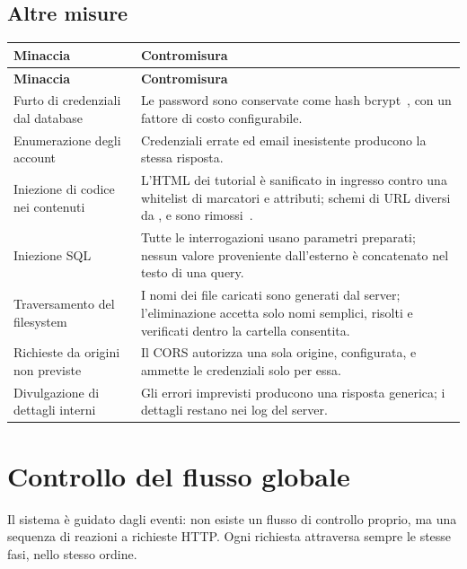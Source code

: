 \subsection{Altre misure}

\begin{longtable}{@{}L{4.2cm} L{10.2cm}@{}}
\toprule
\textbf{Minaccia} & \textbf{Contromisura} \\
\midrule
\endfirsthead
\toprule
\textbf{Minaccia} & \textbf{Contromisura} \\
\midrule
\endhead
\bottomrule
\endlastfoot

Furto di credenziali dal database &
Le password sono conservate come hash bcrypt~\cite{provos1999}, con un fattore
di costo configurabile. \\

Enumerazione degli account &
Credenziali errate ed email inesistente producono la stessa risposta. \\

Iniezione di codice nei contenuti &
L'HTML dei tutorial è sanificato in ingresso contro una whitelist di
marcatori e attributi; schemi di URL diversi da ,  e
 sono rimossi~\cite{owasp2021}. \\

Iniezione SQL &
Tutte le interrogazioni usano parametri preparati; nessun valore proveniente
dall'esterno è concatenato nel testo di una query. \\

Traversamento del filesystem &
I nomi dei file caricati sono generati dal server; l'eliminazione accetta solo
nomi semplici, risolti e verificati dentro la cartella consentita. \\

Richieste da origini non previste &
Il CORS autorizza una sola origine, configurata, e ammette le credenziali solo
per essa. \\

Divulgazione di dettagli interni &
Gli errori imprevisti producono una risposta generica; i dettagli restano nei
log del server. \\

\end{longtable}

\section{Controllo del flusso globale}
\label{sec:sdd-flusso}

Il sistema è guidato dagli eventi: non esiste un flusso di controllo proprio,
ma una sequenza di reazioni a richieste HTTP. Ogni richiesta attraversa
sempre le stesse fasi, nello stesso ordine.

